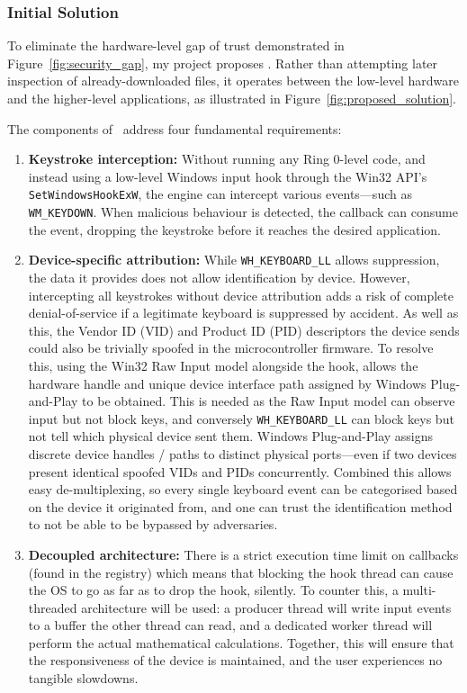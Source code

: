 \subsubsection{Initial Solution}



To eliminate the hardware-level gap of trust demonstrated in Figure~\ref{fig:security_gap}, my project proposes \projectNameFormatted. Rather than attempting later inspection of already-downloaded files, it operates between the low-level hardware and the higher-level applications, as illustrated in Figure~\ref{fig:proposed_solution}.

The components of \projectNameFormatted\ address four fundamental requirements:
\begin{enumerate}
	\item \textbf{Keystroke interception:} Without running any Ring 0-level code, and instead using a low-level Windows input hook through the Win32 API's \texttt{SetWindowsHookExW}, the engine can intercept various events---such as \texttt{WM\_KEYDOWN}. When malicious behaviour is detected, the callback can consume the event, dropping the keystroke before it reaches the desired application.
	\item \textbf{Device-specific attribution:} While \texttt{WH\_KEYBOARD\_LL} allows suppression, the data it provides does not allow identification by device. However, intercepting all keystrokes without device attribution adds a risk of complete denial-of-service if a legitimate keyboard is suppressed by accident. As well as this, the Vendor ID (VID) and Product ID (PID) descriptors the device sends could also be trivially spoofed in the microcontroller firmware. To resolve this, using the Win32 Raw Input model alongside the hook, allows the hardware handle and unique device interface path assigned by Windows Plug-and-Play to be obtained. This is needed as the Raw Input model can observe input but not block keys, and conversely \texttt{WH\_KEYBOARD\_LL} can block keys but not tell which physical device sent them. Windows Plug-and-Play assigns discrete device handles / paths to distinct physical ports---even if two devices present identical spoofed VIDs and PIDs concurrently. Combined this allows easy de-multiplexing, so every single keyboard event can be categorised based on the device it originated from, and one can trust the identification method to not be able to be bypassed by adversaries.
	\item \textbf{Decoupled architecture:} There is a strict execution time limit on callbacks (found in the registry) which means that blocking the hook thread can cause the OS to go as far as to drop the hook, silently. To counter this, a multi-threaded architecture will be used: a producer thread will write input events to a buffer the other thread can read, and a dedicated worker thread will perform the actual mathematical calculations. Together, this will ensure that the responsiveness of the device is maintained, and the user experiences no tangible slowdowns.

\end{enumerate}
